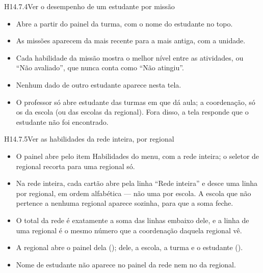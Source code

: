 \begin{historia}{H14.7.4}{Ver o desempenho de um estudante por missão}{\pronto}
\aceite
\begin{itemize}
  \item Abre a partir do painel da turma, com o nome do estudante no topo.
  \item As missões aparecem da mais recente para a mais antiga, com a unidade.
  \item Cada habilidade da missão mostra o melhor nível entre as atividades,
    ou \enquote{Não avaliado}, que nunca conta como \enquote{Não atingiu}.
  \item Nenhum dado de outro estudante aparece nesta tela.
  \item O professor só abre estudante das turmas em que dá aula; a
    coordenação, só os da escola (ou das escolas da regional). Fora disso, a
    tela responde que o estudante não foi encontrado.
\end{itemize}
\end{historia}

\begin{historia}{H14.7.5}{Ver as habilidades da rede inteira, por regional}{\parcial}
\aceite
\begin{itemize}
  \item O painel abre pelo item Habilidades do menu, com a rede inteira; o
    seletor de regional recorta para uma regional só.
  \item Na rede inteira, cada cartão abre pela linha \enquote{Rede inteira} e
    desce uma linha por regional, em ordem alfabética --- não uma por escola.
    A escola que não pertence a nenhuma regional aparece sozinha, para que a
    soma feche.
  \item O total da rede é exatamente a soma das linhas embaixo dele, e a linha
    de uma regional é o mesmo número que a coordenação daquela regional vê.
  \item A regional abre o painel dela (); dele, a escola, a turma e
    o estudante ().
  \item Nome de estudante não aparece no painel da rede nem no da regional.
\end{itemize}
\end{historia}
